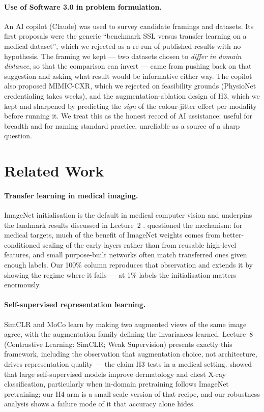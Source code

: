 \documentclass{article}
\begin{document}
\paragraph{Use of Software 3.0 in problem formulation.} An AI copilot (Claude) was used
to survey candidate framings and datasets. Its first proposals were the generic
``benchmark SSL versus transfer learning on a medical dataset'', which we rejected as a
re-run of published results with no hypothesis. The framing we kept --- two datasets
chosen to \emph{differ in domain distance}, so that the comparison can invert --- came
from pushing back on that suggestion and asking what result would be informative either
way. The copilot also proposed MIMIC-CXR, which we rejected on feasibility grounds
(PhysioNet credentialing takes weeks), and the augmentation-ablation design of H3, which
we kept and sharpened by predicting the \emph{sign} of the colour-jitter effect per
modality before running it. We treat this as the honest record of AI assistance: useful
for breadth and for naming standard practice, unreliable as a source of a sharp question.

\section{Related Work}

\paragraph{Transfer learning in medical imaging.} ImageNet initialisation is the default
in medical computer vision \citep{esteva2021medicalcv} and underpins the landmark results
discussed in Lecture~2 \citep{esteva2017dermatologist,rajpurkar2017chexnet}.
\citet{raghu2019transfusion} questioned the mechanism: for medical targets, much of the
benefit of ImageNet weights comes from better-conditioned scaling of the early layers
rather than from reusable high-level features, and small purpose-built networks often
match transferred ones given enough labels. Our 100\% column reproduces that observation
and extends it by showing the regime where it fails --- at 1\% labels the initialisation
matters enormously.

\paragraph{Self-supervised representation learning.} SimCLR \citep{chen2020simclr} and
MoCo \citep{he2020moco} learn by making two augmented views of the same image agree,
with the augmentation family defining the invariances learned. Lecture~8 (Contrastive
Learning: SimCLR; Weak Supervision) presents exactly this framework, including the
observation that augmentation choice, not architecture, drives representation quality ---
the claim H3 tests in a medical setting. \citet{azizi2021bigselfsupervised} showed that
large self-supervised models improve dermatology and chest X-ray classification,
particularly when in-domain pretraining follows ImageNet pretraining; our H4 arm is a
small-scale version of that recipe, and our robustness analysis shows a failure mode of
it that accuracy alone hides.
\end{document}

